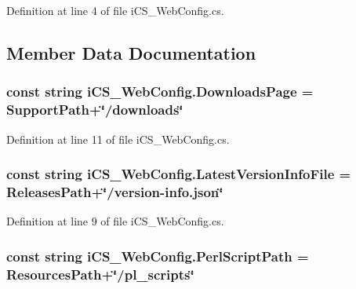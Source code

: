 Definition at line 4 of file i\+C\+S\+\_\+\+Web\+Config.\+cs.



\subsection{Member Data Documentation}
\hypertarget{classi_c_s___web_config_a435a59ac9781685e18003005c08e3160}{
\subsubsection[{Downloads\+Page}]{\setlength{\rightskip}{0pt plus 5cm}const string i\+C\+S\+\_\+\+Web\+Config.\+Downloads\+Page = {\bf Support\+Path}+\char`\"{}/downloads\char`\"{}}}\label{classi_c_s___web_config_a435a59ac9781685e18003005c08e3160}


Definition at line 11 of file i\+C\+S\+\_\+\+Web\+Config.\+cs.

\hypertarget{classi_c_s___web_config_a6ede3973db0f9291b83b1b5841289bad}{
\subsubsection[{Latest\+Version\+Info\+File}]{\setlength{\rightskip}{0pt plus 5cm}const string i\+C\+S\+\_\+\+Web\+Config.\+Latest\+Version\+Info\+File = {\bf Releases\+Path}+\char`\"{}/version-\/info.\+json\char`\"{}}}\label{classi_c_s___web_config_a6ede3973db0f9291b83b1b5841289bad}


Definition at line 9 of file i\+C\+S\+\_\+\+Web\+Config.\+cs.

\hypertarget{classi_c_s___web_config_aa51c9dd66fb2c11646040164361cfbd8}{
\subsubsection[{Perl\+Script\+Path}]{\setlength{\rightskip}{0pt plus 5cm}const string i\+C\+S\+\_\+\+Web\+Config.\+Perl\+Script\+Path = {\bf Resources\+Path}+\char`\"{}/pl\+\_\+scripts\char`\"{}}}\label{classi_c_s___web_config_aa51c9dd66fb2c11646040164361cfbd8}


